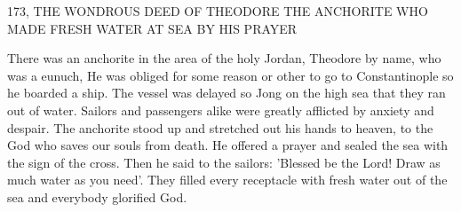 173, THE WONDROUS DEED OF THEODORE
THE ANCHORITE WHO MADE FRESH WATER
AT SEA BY HIS PRAYER

There was an anchorite in the area of the holy Jordan, Theodore by
name, who was a eunuch, He was obliged for some reason or other
to go to Constantinople so he boarded a ship.
The vessel was
delayed so Jong on the high sea that they ran out of water.
Sailors
and passengers alike were greatly afflicted by anxiety and despair.
The anchorite stood up and stretched out his hands to heaven, to
the God who saves our souls from death.
He offered a prayer and
sealed the sea with the sign of the cross.
Then he said to the sailors:
'Blessed be the Lord! Draw as much water as you need'.
They filled
every receptacle with fresh water out of the sea and everybody
glorified God.

